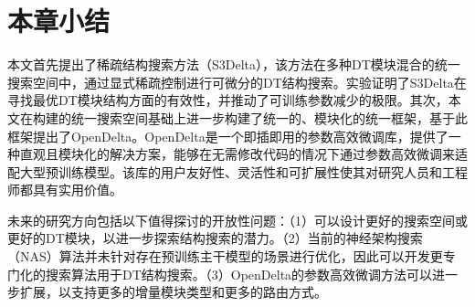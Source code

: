 
\section{本章小结}
本文首先提出了稀疏结构搜索方法（S3Delta），该方法在多种DT模块混合的统一搜索空间中，通过显式稀疏控制进行可微分的DT结构搜索。实验证明了S3Delta在寻找最优DT模块结构方面的有效性，并推动了可训练参数减少的极限。其次，本文在构建的统一搜索空间基础上进一步构建了统一的、模块化的统一框架，基于此框架提出了OpenDelta。OpenDelta是一个即插即用的参数高效微调库，提供了一种直观且模块化的解决方案，能够在无需修改代码的情况下通过参数高效微调来适配大型预训练模型。该库的用户友好性、灵活性和可扩展性使其对研究人员和工程师都具有实用价值。

未来的研究方向包括以下值得探讨的开放性问题：（1）可以设计更好的搜索空间或更好的DT模块，以进一步探索结构搜索的潜力。（2）当前的神经架构搜索（NAS）算法并未针对存在预训练主干模型的场景进行优化，因此可以开发更专门化的搜索算法用于DT结构搜索。（3）OpenDelta的参数高效微调方法可以进一步扩展，以支持更多的增量模块类型和更多的路由方式。
